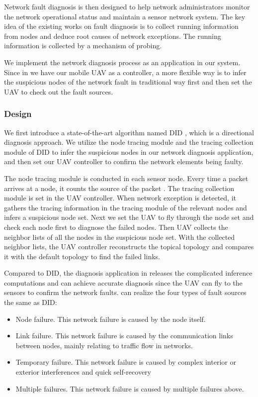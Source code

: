 Network fault diagnosis is then designed to help network administrators monitor the network 
operational status and maintain a sensor network system. The key idea of the existing works
on fault diagnosis is to collect running information from nodes and deduce root causes of network
exceptions. The running information is collected by a mechanism of probing.

We implement the network diagnosis process as an application in our {\sdn} system.
Since in {\sdn} we have our mobile UAV as a controller, a more flexible way is to infer the suspicious 
nodes of the network fault in traditional way first and then set the UAV to check out the fault sources. 
 
\subsubsection{Design}

We first introduce a state-of-the-art algorithm named DID 
\cite{gong2015directional}, which is a directional diagnosis approach.
We utilize the node tracing module and the tracing collection module of DID
to infer the suspicious nodes in our network diagnosis application, 
and then set our UAV controller to confirm the network elements being faulty.

The node tracing module is conducted in each sensor node. 
Every time a packet arrives at a node, it counts
the source of the packet . The tracing collection module
is set in the UAV controller. When network exception is detected, 
it gathers the tracing information in the tracing module of the relevant nodes
and infers a suspicious node set. Next we set the UAV to fly through the 
node set and check each node first to diagnose the failed nodes. 
Then UAV collects the neighbor lists of all the nodes in the suspicious node set.
With the collected neighbor lists, the UAV controller reconstructs the topical topology and 
compares it with the default topology to find the failed links.

Compared to DID, the diagnosis application in {\sdn} releases the complicated inference
computations and can achieve accurate diagnosis since the UAV can fly to the sensors 
to confirm the network faults. {\sdn} can realize the four types of fault sources the same as DID:  
\begin{itemize}
\item	Node failure. This network failure is caused by the node itself.
\item	Link failure. This network failure is caused by the communication links 
between nodes, mainly relating to traffic flow in networks.
\item	Temporary failure. This  network failure is caused by complex interior or exterior 
interferences and quick self-recovery
\item	Multiple failures. This  network failure is caused by multiple failures above.
\end{itemize}



